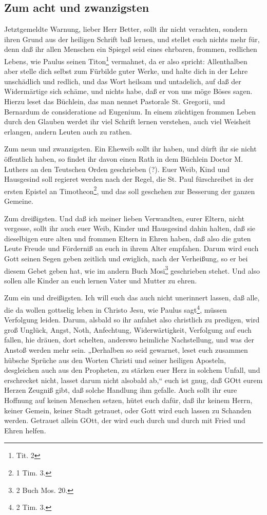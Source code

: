 \subsection{Zum acht und zwanzigsten}

Jetztgemeldte Warnung, lieber Herr Better, sollt ihr nicht verachten, sondern ihren Grund aus der heiligen Schrift baß lernen, und stellet euch nichts mehr für, denn daß ihr allen Menschen ein Spiegel seid eines ehrbaren, frommen, redlichen Lebens, wie Paulus seinen Titon\footnote{Tit. 2} vermahnet, da er also spricht: Allenthalben aber stelle dich selbst zum Fürbilde guter Werke, und halte dich in der Lehre unschädlich und redlich, und das Wort heilsam und untadelich, auf daß der Widermärtige sich schäme, und nichts habe, daß er von
uns möge Böses sagen. Hierzu leset das Büchlein, das man nennet Pastorale St. Gregorii, und Bernardum de consideratione ad Eugenium. In einem züchtigen frommen Leben durch den Glauben werdet ihr viel Schrift lernen verstehen, auch viel Weisheit erlangen, andern Leuten auch zu rathen.

Zum neun und zwanzigsten. Ein Eheweib sollt ihr haben, und dürft ihr sie nicht öffentlich haben, so findet ihr davon einen Rath in dem Büchlein Doctor M. Luthers an den Teutschen Orden geschrieben (?). Euer Weib, Kind und Hausgesind soll regieret werden nach der Regel, die St. Paul fürschreibet in der ersten Epistel an Timotheon\footnote{1 Tim. 3.}, und das soll geschehen zur Besserung der ganzen Gemeine.

Zum dreißigsten. Und daß ich meiner lieben Verwandten, eurer Eltern, nicht vergesse, sollt ihr auch euer Weib, Kinder und Hausgesind dahin halten, daß sie dieselbigen eure alten und frommen Eltern in Ehren haben, daß also die guten Leute Freude und Förderniß an euch in ihrem Alter empfahen. Darum wird euch Gott seinen Segen geben zeitlich und ewiglich, nach der Verheißung, so er bei diesem Gebet geben hat, wie im andern Buch Mosi\footnote{2 Buch Mos. 20.} geschrieben stehet. Und also sollen alle Kinder an euch lernen Vater und Mutter zu ehren.

Zum ein und dreißigsten. Ich will euch das auch nicht unerinnert lassen, daß alle, die da wollen gottselig leben in Christo Jesu, wie Paulus sagt\footnote{2 Tim. 3.}, müssen Verfolgung leiden. Darum, alsbald so ihr anfahet also christlich zu predigen, wird groß Unglück, Angst, Noth, Anfechtung, Widerwärtigkeit, Verfolgung auf euch fallen, hie dräuen, dort schelten, anderswo heimliche Nachstellung, und was der Anstoß werden mehr sein. „Derhalben so seid gewarnet, leset euch zusammen hübsche Sprüche aus den Worten
Christi und seiner heiligen Aposteln, desgleichen auch aus den Propheten, zu stärken euer Herz in solchem Unfall, und erschrecket nicht, lasset darum nicht alsobald ab,“ euch ist gnug, daß GOtt eurem Herzen Zeugniß gibt, daß solche Handlung ihm gefalle. Auch sollt ihr eure Hoffnung auf keinen Menschen setzen, hütet euch dafür, daß ihr keinem Herrn, keiner Gemein, keiner Stadt getrauet, oder Gott wird euch lassen zu Schanden werden. Getrauet allein GOtt, der wird euch durch und durch mit Fried und Ehren helfen.

